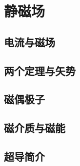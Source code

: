 \chapter{静磁场}


\section{电流与磁场}

\section{两个定理与矢势}

\section{磁偶极子}

\section{磁介质与磁能}

\section{超导简介}
